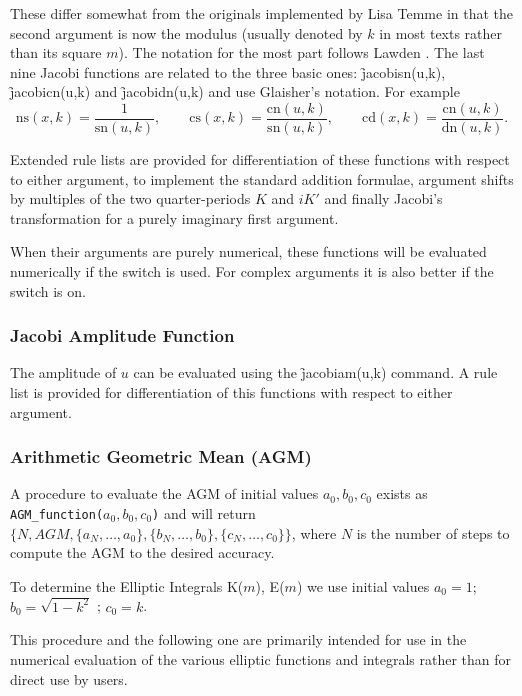 These differ somewhat from the originals implemented by Lisa Temme in that
the second argument is now the modulus (usually denoted by $k$ in most texts
rather than its square $m$).  The notation for the most part follows  Lawden 
\cite{Lawden:89}. The last nine Jacobi functions are related to the three
basic ones: \f{jacobisn(u,k)}, \f{jacobicn(u,k)} and \f{jacobidn(u,k)} and
use Glaisher's notation. For example
\[ \mathrm{ns}(x,k) = \frac{1}{\mathrm{sn}(u,k)}, \qquad
\mathrm{cs}(x,k) = \frac{\mathrm{cn}(u,k)}{\mathrm{sn}(u,k)}, \qquad
\mathrm{cd}(x,k) = \frac{\mathrm{cn}(u,k)}{\mathrm{dn}(u,k)}. \]

Extended rule lists are provided for differentiation of these functions with
respect to either argument, to implement the standard addition formulae,
argument shifts by multiples of the two quarter-periods $K$ and $iK'$ and
finally Jacobi's transformation for a purely imaginary first argument.

When their arguments are purely numerical, these functions  will be evaluated
numerically if the  switch is used. For
complex arguments it is also better if the  switch is on.

\subsubsection{Jacobi Amplitude Function}
\hypertarget{operator:Jacobiam}{}
The amplitude of $u$ can be evaluated using the \f{jacobiam(u,k)}
command.  A rule list is provided for differentiation of this
functions with respect to either argument.

\subsubsection{Arithmetic Geometric Mean (AGM)}
A procedure to evaluate the AGM of initial values \(a_0,b_0,c_0\) 
exists as \\
\texttt{AGM\_function(\(a_0,b_0,c_0\))} and will return \\
$\{ N, AGM, \{ a_N, \ldots ,a_0\}, \{ b_N, \ldots ,b_0\}, 
\{c_N, \ldots ,c_0\}\}$, 
where $N$ is the number of steps to compute the AGM to the 
desired accuracy.

To determine the Elliptic Integrals K($m$), E($m$) we use initial values
\(a_0 = 1\); \(b_0 = \sqrt{1-k^2}\) ; \(c_0 = k\).

This procedure and the following one are primarily intended for use in the
numerical evaluation of the various elliptic functions and integrals rather
than for direct use by users.

